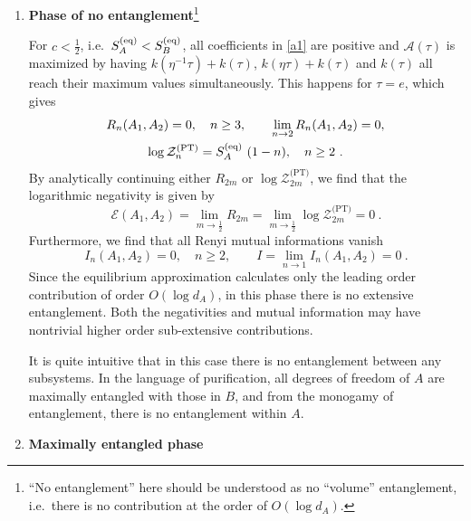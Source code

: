 \documentclass[a4paper,11pt]{article}
\newcommand{\HL}[1]{\textcolor{magenta}{#1}}
\newcommand\half{{\ensuremath{\frac{1}{2}}}}
\newcommand{\Zpt}{\sZ_n^{(\text{PT})}}
\newcommand{\be}{\begin{equation}}
\newcommand{\ee}{\end{equation}}
\newcommand\lam{\lambda}
\newcommand\ha{{\half}}
\newcommand\sA{{\ensuremath{{\mathcal A}}}}
\newcommand\sE{{\ensuremath{{\mathcal E}}}}
\newcommand\sZ{{\mathcal Z}}
\begin{document}
\begin{enumerate} 
\item \textbf{Phase of no entanglement}\footnote{``No entanglement'' here should be understood as no ``volume'' entanglement, i.e.~there is no contribution at the order of $O(\log d_A)$.} 

For $c<\ha$, i.e.~$S^{\rm (eq)}_A < S^{\rm (eq)}_B$, all coefficients in \eqref{a1} are positive and $\sA(\tau)$ is maximized by having $k(\eta^{-1}\tau)+ k(\tau)$, $k(\eta\tau)+ k(\tau)$ and 
$k(\tau)$ all reach their maximum values simultaneously. This happens for $\tau=e$, which gives 
\be
\begin{gathered} 
R_n(A_1, A_2) = 0, \quad n\geq 3, \quad \quad
\lim_{n\rightarrow 2} R_n(A_1, A_2) = 0, \\
\log \Zpt = S_A^{(\rm eq)} ~(1-n), \quad n \geq 2 \ .
\label{inf_un}
\end{gathered}
\ee
By analytically continuing either $R_{2m}$ or $\log \sZ_{2m}^{\text{(PT)}}$, we find that the logarithmic negativity is given by 
\be 
\sE(A_1, A_2) = \lim_{m\rightarrow \ha} R_{2m} = \lim_{m\rightarrow \ha}\log \sZ_{2m}^{\text{(PT)}} = 0 \ . \label{zeroinf}
\ee
Furthermore, we find that all Renyi mutual informations vanish
\be 
I_n(A_1, A_2)= 0 , \quad n\geq 2, \quad \quad I = \lim_{n\rightarrow 1} I_n(A_1, A_2) = 0 \ .
\ee
Since the equilibrium approximation calculates only the leading order contribution of order $O(\log d_A)$, in this phase there is no extensive entanglement. Both the negativities and mutual information may have nontrivial higher order sub-extensive contributions. 

It is quite intuitive that in this case there is no entanglement between any subsystems. 
In the language of purification, all degrees of freedom of $A$ are maximally entangled with those in $B$, and from the monogamy of entanglement, there is no entanglement within $A$. 

 
 
\item \textbf{Maximally entangled phase} 
 

\end{enumerate}
\end{document}
